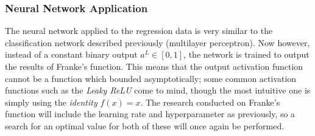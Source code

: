         \subsubsection{Neural Network Application}
            The neural network applied to the regression data is very similar to the classification network described previously (multilayer perceptron). Now however, instead of a constant binary output $a^L\in[0,1]$, the network is trained to output the results of Franke's function. This means that the output activation function cannot be a function which bounded asymptotically; some common activation functions such as the \textit{Leaky ReLU} come to mind, though the most intuitive one is simply using the \textit{identity} $f(x)=x$. The research conducted on Franke's function will include the learning rate and hyperparameter as previously, so a search for an optimal value for both of these will once again be performed.